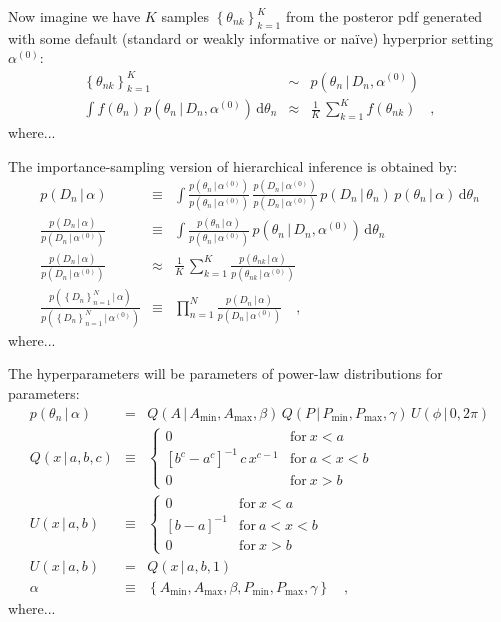 \documentclass[12pt]{article}
\newcommand{\given}{\,|\,}
\newcommand{\dd}{\mathrm{d}}
\newcommand{\pdf}{p}
\newcommand{\setof}[1]{\left\{{#1}\right\}}
\newcommand{\data}{D_n}
\newcommand{\setofalldata}{\setof{\data}_{n=1}^N}
\newcommand{\parsymbol}{\theta}
\newcommand{\pars}{\parsymbol_n}
\newcommand{\hyperpars}{\alpha}
\newcommand{\sample}{\parsymbol_{nk}}
\newcommand{\default}[1]{{#1}^{(0)}}
\newcommand{\setofallsamples}{\setof{\sample}_{k=1}^K}
\newcommand{\amp}{A}
\newcommand{\period}{P}
\newcommand{\phase}{\phi}
\newcommand{\ampmin}{\amp_{\min}}
\newcommand{\ampmax}{\amp_{\max}}
\newcommand{\amppower}{\beta}
\newcommand{\periodmin}{\period_{\min}}
\newcommand{\periodmax}{\period_{\max}}
\newcommand{\periodpower}{\gamma}
\newcommand{\pareto}{Q}
\newcommand{\uniform}{U}
\begin{document}
Now imagine we have $K$ samples $\setofallsamples$ from the
posteror pdf generated with some default (standard or weakly
informative or na\"ive) hyperprior setting $\default{\hyperpars}$:
\begin{eqnarray}
\setofallsamples
 &\sim&
\pdf(\pars\given\data,\default{\hyperpars})
\\
\int f(\pars)\,\pdf(\pars\given\data,\default{\hyperpars})\,\dd\pars
 &\approx&
\frac{1}{K}\,\sum_{k=1}^K f(\sample)
\quad,
\end{eqnarray}
where...

The importance-sampling version of hierarchical inference is
obtained by:
\begin{eqnarray}
\pdf(\data\given\hyperpars)
 &\equiv&
\int \frac{\pdf(\pars\given\default{\hyperpars})}{\pdf(\pars\given\default{\hyperpars})}\,\frac{\pdf(\data\given\default{\hyperpars})}{\pdf(\data\given\default{\hyperpars})}\,\pdf(\data\given\pars)\,\pdf(\pars\given\hyperpars)\,\dd\pars
\\
\frac{\pdf(\data\given\hyperpars)}{\pdf(\data\given\default{\hyperpars})} 
 &\equiv&
\int \frac{\pdf(\pars\given\hyperpars)}{\pdf(\pars\given\default{\hyperpars})}\,\pdf(\pars\given\data,\default{\hyperpars})\,\dd\pars
\\
\frac{\pdf(\data\given\hyperpars)}{\pdf(\data\given\default{\hyperpars})} 
 &\approx&
\frac{1}{K}\,\sum_{k=1}^K \frac{\pdf(\sample\given\hyperpars)}{\pdf(\sample\given\default{\hyperpars})}
\\
\frac{\pdf(\setofalldata\given\hyperpars)}{\pdf(\setofalldata\given\default{\hyperpars})} &\equiv& \prod_{n=1}^N \frac{\pdf(\data\given\hyperpars)}{\pdf(\data\given\default{\hyperpars})}
\quad,
\end{eqnarray}
where...

The hyperparameters will be parameters of power-law distributions for
parameters:
\begin{eqnarray}
\pdf(\pars\given\hyperpars)
  &=&
\pareto(\amp\given\ampmin,\ampmax,\amppower)\,\pareto(\period\given\periodmin,\periodmax,\periodpower)\,\uniform(\phase\given 0,2\pi)
\\
\pareto(x\given a,b,c)
  &\equiv&
\left\{\begin{array}{cl}
  0 & \mbox{for}~x < a \\
  {[b^c - a^c]}^{-1}\,c\,x^{c-1} & \mbox{for}~a < x < b \\
  0 & \mbox{for}~x > b
\end{array}\right.
\\
\uniform(x\given a,b)
  &\equiv&
\left\{\begin{array}{cl}
  0 & \mbox{for}~x < a \\
  {[b - a]}^{-1} & \mbox{for}~a < x < b \\
  0 & \mbox{for}~x > b
\end{array}\right.
\\
\uniform(x\given a,b)
  &=& \pareto(x\given a,b,1)
\\
\hyperpars
  &\equiv&
\setof{\ampmin, \ampmax, \amppower, \periodmin, \periodmax, \periodpower}
\quad,
\end{eqnarray}
where...
\end{document}
